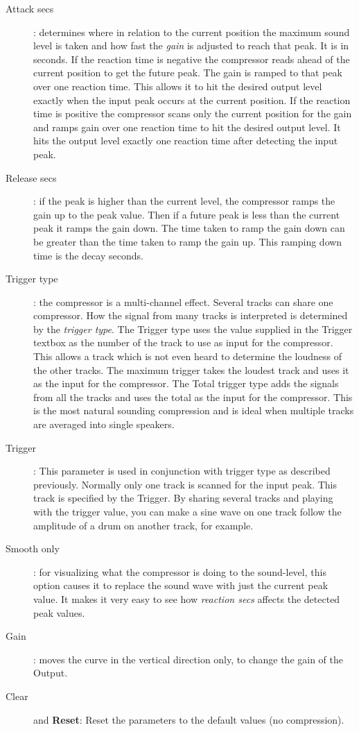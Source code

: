\begin{description}
    \item[Attack secs]: determines where in relation to the current position the maximum sound level is taken and how fast the \textit{gain} is adjusted to reach that peak. It is in seconds. If the reaction time is negative the compressor reads ahead of the current position to get the future peak. The gain is ramped to that peak over one reaction time. This allows it to hit the desired output level exactly when the input peak occurs at the current position. If the reaction time is positive the compressor scans only the current position for the gain and ramps gain over one reaction time to hit the desired output level. It hits the output level exactly one reaction time
    after detecting the input peak.
    \item[Release secs]: if the peak is higher than the current level, the compressor ramps the gain up to the peak value. Then if a future peak is less than the current peak it ramps the gain down. The time taken to ramp the gain down can be greater than the time taken to ramp the gain up. This ramping down time is the decay seconds.
    \item[Trigger type]: the compressor is a multi-channel effect. Several tracks can share one compressor. How the signal from many tracks is interpreted is determined by the \textit{trigger type}. The Trigger type uses the value supplied in the Trigger textbox as the number of the track to use as input for the compressor. This allows a track which is not even heard to determine the loudness of the other tracks. The maximum trigger takes the loudest track and uses it as the input for the compressor. The Total trigger type adds the signals from all the tracks and uses the total as the input for the compressor. This is the most natural sounding compression and is ideal when multiple tracks are averaged into single speakers.
    \item[Trigger]: This parameter is used in conjunction with trigger type as described previously. Normally only one track is scanned for the input peak. This track is specified by the Trigger. By sharing several tracks and playing with the trigger value, you can make a sine wave on one track follow the amplitude of a drum on another track, for example.
    \item[Smooth only]: for visualizing what the compressor is doing to the sound-level, this option causes it to replace the sound wave with just the current peak value. It makes it very easy to see how \textit{reaction secs} affects the detected peak values.
    \item[Gain]: moves the curve in the vertical direction only, to change the gain of the Output.
    \item[Clear] and \textbf{Reset}:  Reset the parameters to the default values (no compression).
\end{description}

